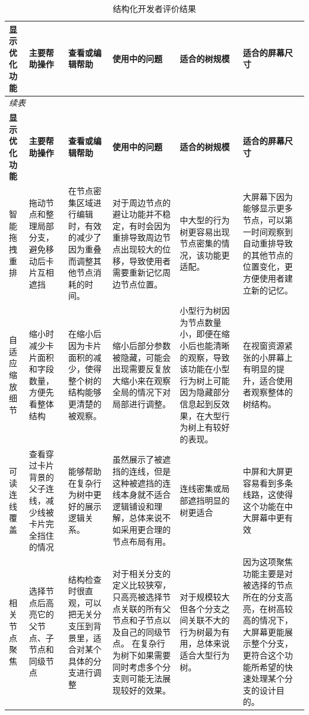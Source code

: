 \documentclass[11pt,a4paper,oneside,extrafontsizes]{memoir}
\begin{document}
\begin{center}

\begin{longtable}{@{}p{} p{} p{} p{} p{} p{}@{}}
\caption{结构化开发者评价结果}\label{tab:developer-evaluation}\\
\toprule
\textbf{显示优化功能} & \textbf{主要帮助操作} & \textbf{查看或编辑帮助} & \textbf{使用中的问题} & \textbf{适合的树规模} & \textbf{适合的屏幕尺寸} \\
\midrule
\endfirsthead
\multicolumn{6}{l}{\itshape 续表}\\
\toprule
\textbf{显示优化功能} & \textbf{主要帮助操作} & \textbf{查看或编辑帮助} & \textbf{使用中的问题} & \textbf{适合的树规模} & \textbf{适合的屏幕尺寸} \\
\midrule
\endhead
智能拖拽重排 & 拖动节点和整理局部分支，避免移动后卡片互相遮挡 & 在节点密集区域进行编辑时，有效的减少了因为重叠而调整其他节点消耗的时间。 & 对于周边节点的避让功能并不稳定，有时会因为重排导致周边节点出现较大的位移，导致使用者需要重新记忆周边节点位置。 & 中大型的行为树更容易出现节点密集的情况，该功能更适配。 & 大屏幕下因为能够显示更多节点，可以第一时间观察到自动重排导致的其他节点的位置变化，更方便使用者建立新的记忆。 \\
自适应缩放细节 & 缩小时减少卡片面积和字段数量，方便先看整体结构 & 在缩小后因为卡片面积的减少，使得整个树的结构能够更清楚的被观察。 & 缩小后部分参数被隐藏，可能会出现需要反复放大缩小来在观察全局的情况下对局部进行调整。 & 小型行为树因为节点数量小，即便在缩小后也能清晰的观察，导致该功能在小型行为树上可能因为隐藏部分信息起到反效果，在大型行为树上有较好的表现。 & 在视窗资源紧张的小屏幕上有明显的提升，适合使用者观察整体的树结构。 \\
可读连线覆盖 & 查看穿过卡片背景的父子连线，减少线被卡片完全挡住的情况 & 能够帮助在复杂行为树中更好的展示逻辑关系。 & 虽然展示了被遮挡的连线，但是这种被遮挡的连线本身就不适合逻辑铺设和理解，总体来说不如采用更合理的节点布局有用。 & 连线密集或局部遮挡明显的树更适合 & 中屏和大屏更容易看到多条线路，这使得这个功能在中大屏幕中更有效 \\
相关节点聚焦 & 选择节点后高亮它的父节点、子节点和同级节点 & 结构检查时很直观，可以把无关分支压到背景里，适合对某个具体的分支进行调整 & 对于相关分支的定义比较狭窄，只高亮被选择节点关联的所有父节点和子节点以及自己的同级节点。 在复杂行为树下如果需要同时考虑多个分支则可能无法展现较好的效果。 & 对于规模较大但各个分支之间关联不大的行为树最为有用，总体来说适合大型行为树。 & 因为这项聚焦功能主要是对被选择的节点所在的分支高亮，在树高较高的情况下，大屏幕更能展示整个分支，更符合这个功能所希望的快速处理某个分支的设计目的。 \\

\end{longtable}
\end{center}
\end{document}
